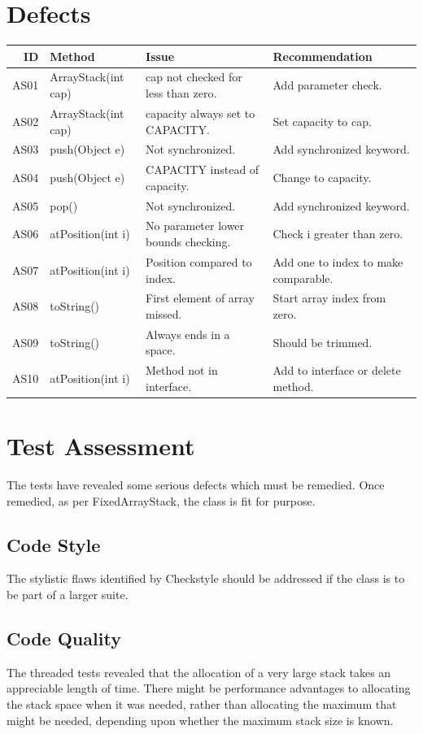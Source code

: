 \documentclass [12pt, a4paper, twoside, titlepage] {article}
\begin{document}
\section{Defects}
\begin{table}[!htbp]
\begin{tabularx}{\textwidth}{|r|X|X|X|}
\hline
\textbf{ID} & \textbf{Method} & \textbf{Issue} & \textbf{Recommendation} \\ 
\hline
AS01 & ArrayStack(int cap) & cap not checked for less than zero. & Add parameter check.\\
AS02 & ArrayStack(int cap) & capacity always set to CAPACITY. & Set capacity to cap.\\
AS03 & push(Object e) & Not synchronized. & Add synchronized keyword. \\
AS04 & push(Object e) & CAPACITY instead of capacity. & Change to capacity.\\
AS05 & pop() & Not synchronized. & Add synchronized keyword. \\
AS06 & atPosition(int i) & No parameter lower bounds checking. & Check i greater than zero.\\
AS07 & atPosition(int i) & Position compared to index. & Add one to index to make comparable. \\
AS08 & toString() & First element of array missed. & Start array index from zero. \\
AS09 & toString() & Always ends in a space. & Should be trimmed.\\
AS10 & atPosition(int i) & Method not in interface. & Add to interface or delete method. \\
\hline
\end{tabularx}
\end{table}

\section{Test Assessment}

The tests have revealed some serious defects which must be remedied.
Once remedied, as per FixedArrayStack, the class is fit for purpose.

\subsection{Code Style}
The stylistic flaws identified by Checkstyle should be addressed if the class is to be part of a larger suite.

\subsection{Code Quality}
The threaded tests revealed that the allocation of  a very large stack takes an appreciable length of time. 
There might be performance advantages to allocating 
the stack space when it was needed, rather than allocating the maximum that might be needed,
depending upon whether the maximum stack size is known.
\end{document}
